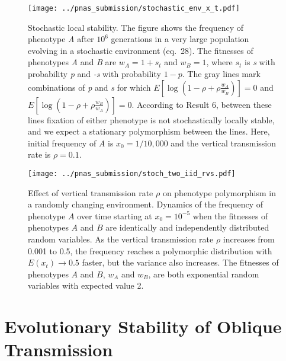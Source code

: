 \documentclass[9pt,twocolumn,twoside,lineno]{pnas-new}
\begin{document}
\begin{figure}[h]
\centering
\texttt{[image: ../pnas\_submission/stochastic\_env\_x\_t.pdf]}
\caption{Stochastic local stability. 
The figure shows the frequency of phenotype \emph{A} after \(10^6\) generations in a very large population evolving in a stochastic environment (eq.\ 28).
The fitnesses of phenotypes \emph{A} and \emph{B} are \(w_A=1+s_t\) and \(w_B=1\),
where \(s_t\) is \emph{s} with probability \emph{p} and \emph{-s} with probability \(1-p\).
The gray lines mark combinations of \emph{p} and \emph{s} for which \(E[\log{(1-\rho+\rho\frac{w_A}{w_B})}]=0\) and \(E[\log{(1-\rho+\rho\frac{w_B}{w_A})}]=0\).
According to Result 6, between these lines fixation of either phenotype is not stochastically locally stable, and we expect a stationary polymorphism between the lines.
Here, initial frequency of \(A\) is \(x_0=1/10,000\) and the vertical transmission rate is \(\rho=0.1\).}\label{fig:stochastic_env_x_t}
\end{figure} 

\begin{figure}[h]
\centering
\texttt{[image: ../pnas\_submission/stoch\_two\_iid\_rvs.pdf]}
\caption{Effect of vertical transmission rate $\rho$ on phenotype polymorphism in a randomly changing environment. Dynamics of the frequency of phenotype \(A\) over time starting at \(x_0=10^{-5}\) when the fitnesses of phenotypes \(A\) and \(B\) are identically and independently distributed random variables.
As the vertical transmission rate \(\rho\) increases from 0.001 to 0.5, the frequency reaches a polymorphic distribution with \(E(x_t)\to0.5\) faster,
but the variance also increases.
The fitnesses of phenotypes \(A\) and \(B\), \(w_A\) and \(w_B\), are both exponential random variables with expected value 2.}\label{fig:stoch_two_iid_rvs}
\end{figure}

\section{Evolutionary Stability of Oblique Transmission}
 
\end{document}
